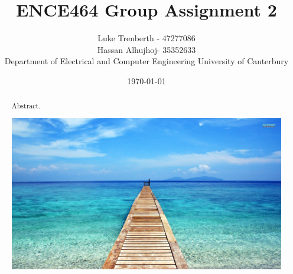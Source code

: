 \documentclass[a4paper, 12pt]{article}
\title{\vspace{-1cm} ENCE464 Group Assignment 2}
\author{Luke Trenberth - 47277086 \\ Hassan Alhujhoj-  35352633\\
	\small Department of Electrical and Computer Engineering University of Canterbury}
\date{\today}
\begin{document}
     \title{}
    \maketitle
    \begin{abstract}
Abstract.
\graphicspath{{./wiki/}}
\includegraphics[scale=0.1]{fig1.png}
    \end{abstract}

     
    
    
\end{document}
